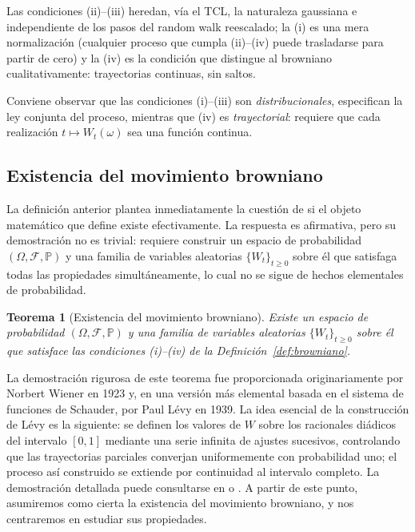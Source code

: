 \documentclass[11pt,a4paper,oneside]{report}
\theoremstyle{plain}
\newtheorem{teorema}{Teorema}[chapter]
\theoremstyle{definition}
\theoremstyle{remark}
\newcommand{\PP}{\mathbb{P}}
\newcommand{\F}{\mathcal{F}}
\newcommand{\1}{\mathbf{1}}
\begin{document}
Las condiciones (ii)–(iii) heredan, vía el TCL, la naturaleza
gaussiana e independiente de los pasos del random walk reescalado;
la (i) es una mera normalización (cualquier proceso que cumpla
(ii)–(iv) puede trasladarse para partir de cero) y la (iv) es la
condición que distingue al browniano cualitativamente: trayectorias
continuas, sin saltos.

Conviene observar que las condiciones (i)–(iii) son
\emph{distribucionales}, especifican la ley conjunta del proceso,
mientras que (iv) es \emph{trayectorial}: requiere que cada
realización $t \mapsto W_t(\omega)$ sea una función continua.

\newpage

\subsection{Existencia del movimiento browniano}
\label{subsec:browniano_existencia}

La definición anterior plantea inmediatamente la cuestión de si el
objeto matemático que define existe efectivamente. La respuesta es
afirmativa, pero su demostración no es trivial: requiere construir un
espacio de probabilidad $(\Omega, \F, \PP)$ y una familia de variables
aleatorias $\{W_t\}_{t \geq 0}$ sobre él que satisfaga todas las
propiedades simultáneamente, lo cual no se sigue de hechos elementales
de probabilidad.

\begin{teorema}[Existencia del movimiento browniano]
\label{teo:existencia_browniano}
Existe un espacio de probabilidad $(\Omega, \F, \PP)$ y una familia de
variables aleatorias $\{W_t\}_{t \geq 0}$ sobre él que satisface las
condiciones (i)--(iv) de la Definición~\ref{def:browniano}.
\end{teorema}

La demostración rigurosa de este teorema fue proporcionada
originariamente por Norbert Wiener en 1923 y, en una versión más
elemental basada en el sistema de funciones de Schauder, por Paul
Lévy en 1939. La idea esencial de la construcción de Lévy es la
siguiente: se definen los valores de $W$ sobre los racionales diádicos
del intervalo $[0, 1]$ mediante una serie infinita de ajustes
sucesivos, controlando que las trayectorias parciales converjan
uniformemente con probabilidad uno; el proceso así construido se
extiende por continuidad al intervalo completo. La demostración
detallada puede consultarse en \cite{karatzas-shreve} o \cite{williams}.
A partir de este punto, asumiremos como cierta la existencia del
movimiento browniano, y nos centraremos en estudiar sus propiedades.
\end{document}
